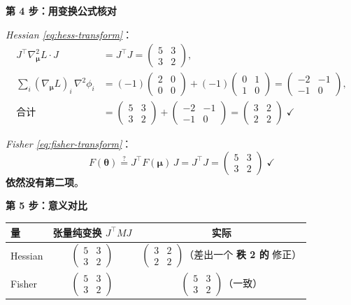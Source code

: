 \documentclass[11pt,a4paper]{article}
\theoremstyle{mythm}
\theoremstyle{mydef}
\begin{document}
\textbf{第 4 步：用变换公式核对}

\emph{Hessian \eqref{eq:hess-transform}}：
\begin{align*}
J^\top \nabla^2_{\boldsymbol\mu} L \cdot J &= J^\top J = \begin{pmatrix}5 & 3\\ 3 & 2\end{pmatrix},\\[2pt]
\sum_i (\nabla_{\boldsymbol\mu}L)_i\, \nabla^2 \phi_i &= (-1)\!\begin{pmatrix}2 & 0\\ 0 & 0\end{pmatrix} + (-1)\!\begin{pmatrix}0 & 1\\ 1 & 0\end{pmatrix} = \boxed{\begin{pmatrix}-2 & -1\\ -1 & 0\end{pmatrix}},\\[2pt]
\text{合计} &= \begin{pmatrix}5 & 3\\ 3 & 2\end{pmatrix} + \begin{pmatrix}-2 & -1\\ -1 & 0\end{pmatrix} = \begin{pmatrix}3 & 2\\ 2 & 2\end{pmatrix}\;\checkmark
\end{align*}

\emph{Fisher \eqref{eq:fisher-transform}}：
$$F(\boldsymbol\theta) \stackrel{?}{=} J^\top F(\boldsymbol\mu)\, J = J^\top J = \begin{pmatrix}5 & 3\\ 3 & 2\end{pmatrix}\;\checkmark$$
\textbf{依然没有第二项}。

\textbf{第 5 步：意义对比}

\begin{center}
\begin{tabular}{l|cc}
\hline
量 & 张量纯变换 $J^\top M J$ & 实际 \\\hline
Hessian & $\begin{pmatrix}5 & 3\\ 3 & 2\end{pmatrix}$ & $\begin{pmatrix}3 & 2\\ 2 & 2\end{pmatrix}$（差出一个 \textbf{秩 2 的} 修正） \\[10pt]
Fisher & $\begin{pmatrix}5 & 3\\ 3 & 2\end{pmatrix}$ & $\begin{pmatrix}5 & 3\\ 3 & 2\end{pmatrix}$（一致） \\
\hline
\end{tabular}
\end{center}
\end{document}
